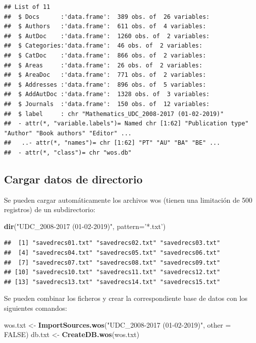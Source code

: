 \documentclass[]{book}
\newenvironment{Shaded}{\begin{snugshade}}{\end{snugshade}}
\newcommand{\DataTypeTok}[1]{\textcolor[rgb]{0.13,0.29,0.53}{#1}}
\newcommand{\KeywordTok}[1]{\textcolor[rgb]{0.13,0.29,0.53}{\textbf{#1}}}
\newcommand{\NormalTok}[1]{#1}
\newcommand{\OtherTok}[1]{\textcolor[rgb]{0.56,0.35,0.01}{#1}}
\newcommand{\StringTok}[1]{\textcolor[rgb]{0.31,0.60,0.02}{#1}}
\begin{document}
\begin{verbatim}
## List of 11
##  $ Docs      :'data.frame':  389 obs. of  26 variables:
##  $ Authors   :'data.frame':  611 obs. of  4 variables:
##  $ AutDoc    :'data.frame':  1260 obs. of  2 variables:
##  $ Categories:'data.frame':  46 obs. of  2 variables:
##  $ CatDoc    :'data.frame':  866 obs. of  2 variables:
##  $ Areas     :'data.frame':  26 obs. of  2 variables:
##  $ AreaDoc   :'data.frame':  771 obs. of  2 variables:
##  $ Addresses :'data.frame':  896 obs. of  5 variables:
##  $ AddAutDoc :'data.frame':  1328 obs. of  3 variables:
##  $ Journals  :'data.frame':  150 obs. of  12 variables:
##  $ label     : chr "Mathematics_UDC_2008-2017 (01-02-2019)"
##  - attr(*, "variable.labels")= Named chr [1:62] "Publication type" "Author" "Book authors" "Editor" ...
##   ..- attr(*, "names")= chr [1:62] "PT" "AU" "BA" "BE" ...
##  - attr(*, "class")= chr "wos.db"
\end{verbatim}

\hypertarget{cargar-datos-de-directorio}{%
\subsection{Cargar datos de directorio}\label{cargar-datos-de-directorio}}

Se pueden cargar automáticamente los archivos wos
(tienen una limitación de 500 registros) de un subdirectorio:

\begin{Shaded}
\begin{Highlighting}[]
\KeywordTok{dir}\NormalTok{(}\StringTok{"UDC_2008-2017 (01-02-2019)"}\NormalTok{, }\DataTypeTok{pattern=}\StringTok{'*.txt'}\NormalTok{)}
\end{Highlighting}
\end{Shaded}

\begin{verbatim}
##  [1] "savedrecs01.txt" "savedrecs02.txt" "savedrecs03.txt"
##  [4] "savedrecs04.txt" "savedrecs05.txt" "savedrecs06.txt"
##  [7] "savedrecs07.txt" "savedrecs08.txt" "savedrecs09.txt"
## [10] "savedrecs10.txt" "savedrecs11.txt" "savedrecs12.txt"
## [13] "savedrecs13.txt" "savedrecs14.txt" "savedrecs15.txt"
\end{verbatim}

Se pueden combinar los ficheros y crear la correspondiente base de datos con los siguientes comandos:

\begin{Shaded}
\begin{Highlighting}[]
\NormalTok{wos.txt <-}\StringTok{ }\KeywordTok{ImportSources.wos}\NormalTok{(}\StringTok{"UDC_2008-2017 (01-02-2019)"}\NormalTok{, }\DataTypeTok{other =} \OtherTok{FALSE}\NormalTok{)}
\NormalTok{db.txt <-}\StringTok{ }\KeywordTok{CreateDB.wos}\NormalTok{(wos.txt)}
\end{Highlighting}
\end{Shaded}
\end{document}
